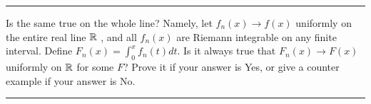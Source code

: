\documentclass[11pt]{article}
\begin{document}
\hrule



Is the same true on the whole line? Namely, let $f_n(x) \to f(x)$ uniformly on the entire real line $\mathbb{R}$
, and all $f_n(x)$ are Riemann integrable on any finite interval. Define $F_n(x) = \int_0 ^x f_n(t) dt$.
Is it always true that $F_n(x) \to F(x)$ uniformly on $\mathbb{R}$ for some $F$?
Prove it if your answer is Yes, or give a counter example if your answer is No.

\hrule
\end{document}
